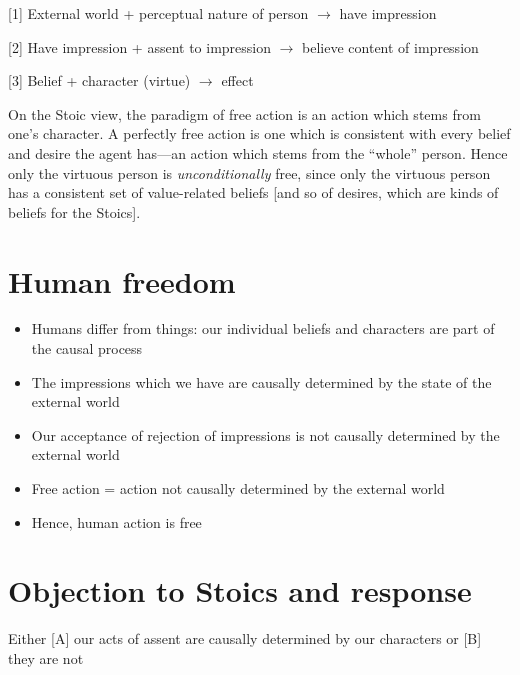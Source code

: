 \documentclass[11pt]{article}
\begin{document}
\hspace*{5mm} [1] External world + perceptual nature of person $\rightarrow$ have impression
\vspace*{1mm}

\hspace*{5mm} [2] Have impression + assent to impression $\rightarrow$ believe content of impression
\vspace*{1mm}

\hspace*{5mm} [3] Belief + character (virtue) $\rightarrow$ effect
\vspace*{2mm}

\noindent  On the Stoic view, the paradigm of free action is an action which stems from one's character. A perfectly free action is one which is consistent with every belief and desire the agent has---an action which stems from the ``whole'' person. Hence only the virtuous person is \emph{unconditionally} free, since only the virtuous person has a consistent set of value-related beliefs [and so of desires, which are kinds of beliefs for the Stoics].
\vspace*{2mm}

\section*{Human freedom}

\begin{itemize}
\item Humans differ from things: our individual beliefs and characters are part of the causal process
\item The impressions which we have are causally determined by the state of the external world
\item Our acceptance of rejection of impressions is not causally determined by the external world
\item Free action = action not causally determined by the external world
\item Hence, human action is free
\end{itemize}

\section*{Objection to Stoics and response}

\noindent Either [A] our acts of assent are causally determined by our characters or [B] they are not
\vspace*{1mm}
\end{document}

